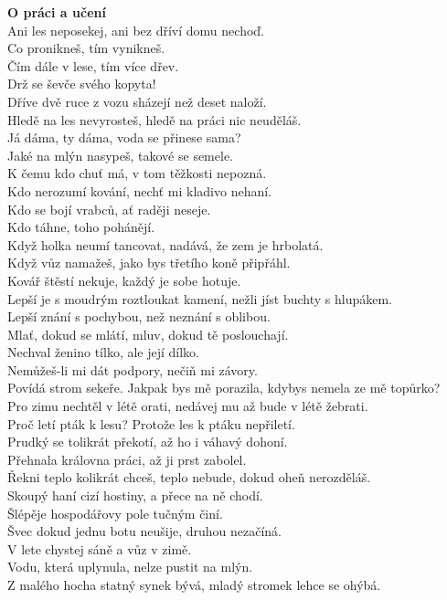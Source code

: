 \begin{multicols}{\value{columnsgames}}
\noindent
{\large\bf O práci a učení}\\[1 mm]
Ani les neposekej, ani bez dříví domu nechoď.\\
Co pronikneš, tím vynikneš.\\
Čím dále v lese, tím více dřev.\\
Drž se ševče svého kopyta!\\
Dříve dvě ruce z vozu sházejí než deset naloží.\\
Hledě na les nevyrosteš, hledě na práci nic neuděláš.\\
Já dáma, ty dáma, voda se přinese sama?\\
Jaké na mlýn nasypeš, takové se semele.\\
K čemu kdo chuť má, v tom těžkosti nepozná.\\
Kdo nerozumí kování, nechť mi kladivo nehaní.\\
Kdo se bojí vrabců, ať raději neseje.\\
Kdo táhne, toho pohánějí.\\
Když holka neumí tancovat, nadává, že zem je hrbolatá.\\
Když vůz namažeš, jako bys třetího koně připřáhl.\\
Kovář štěstí nekuje, každý je sobe hotuje.\\
Lepší je s moudrým roztloukat kamení, nežli jíst buchty s hlupákem.\\
Lepší znání s pochybou, než neznání s oblibou.\\
Mlať, dokud se mlátí, mluv, dokud tě poslouchají.\\
Nechval ženino tílko, ale její dílko.\\
Nemůžeš-li mi dát podpory, nečiň mi závory.\\
Povídá strom sekeře. Jakpak bys mě porazila, kdybys nemela ze 
mě topůrko?\\
Pro zimu nechtěl v létě orati, nedávej mu až bude v létě žebrati.\\
Proč letí pták k lesu? Protože les k ptáku nepřiletí.\\
Prudký se tolikrát překotí, až ho i váhavý dohoní.\\
Přehnala královna práci, až ji prst zabolel.\\
Řekni teplo kolikrát chceš, teplo nebude, dokud oheň nerozděláš.\\
Skoupý haní cizí hostiny, a přece na ně chodí.\\
Šlépěje hospodářovy pole tučným činí.\\
Švec dokud jednu botu neušije, druhou nezačíná.\\
V lete chystej sáně a vůz v zimě.\\
Vodu, která uplynula, nelze pustit na mlýn.\\
Z malého hocha statný synek bývá, mladý stromek lehce se ohýbá.\\


\end{multicols}
